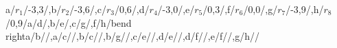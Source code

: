 \begin{compatibilitygraph}{a/$r_1$/{-3,3}/,b/$r_2$/{-3,6}/,c/$r_3$/{0,6}/,d/$r_4$/{-3,0}/,e/$r_5$/{0,3}/,f/$r_6$/{0,0}/,g/$r_7$/{-3,9}/,h/$r_8$/{0,9}/}{a/d/,b/e/,c/g/,f/h/bend right}{a/b//,a/c//,b/c//,b/g//,c/e//,d/e//,d/f//,e/f//,g/h//}{}{}
\end{compatibilitygraph}